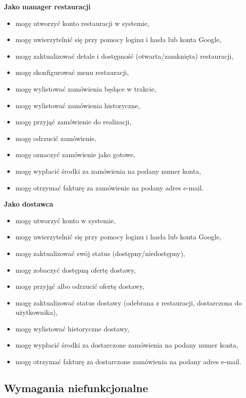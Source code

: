 \medskip

\textbf{Jako manager restauracji}
\begin{itemize}
    \item mogę utworzyć konto restauracji w systemie,
    \item mogę uwierzytelnić się przy pomocy loginu i hasła lub konta Google,
    \item mogę zaktualizować detale i dostępność (otwarta/zamknięta) restauracji,
    \item mogę skonfigurować menu restauracji,
    \item mogę wylistować zamówienia będące w trakcie,
    \item mogę wylistować zamówienia historyczne,
    \item mogę przyjąć zamówienie do realizacji,
    \item mogę odrzucić zamówienie,
    \item mogę oznaczyć zamówienie jako gotowe,
    \item mogę wypłacić środki za zamówienia na podany numer konta,
    \item mogę otrzymać fakturę za zamówienie na podany adres e-mail.
\end{itemize}

\medskip

\textbf{Jako dostawca}
\begin{itemize}
    \item mogę utworzyć konto w systemie,
    \item mogę uwierzytelnić się przy pomocy loginu i hasła lub konta Google,
    \item mogę zaktualizować swój status (dostępny/niedostępny),
    \item mogę zobaczyć dostępną ofertę dostawy,
    \item mogę przyjąć albo odrzucić ofertę dostawy,
    \item mogę zaktualizować status dostawy (odebrana z restauracji, dostarczona do użytkownika),
    \item mogę wylistować historyczne dostawy,
    \item mogę wypłacić środki za dostarczone zamówienia na podany numer konta,
    \item mogę otrzymać fakturę za dostarczone zamówienia na podany adres e-mail.
\end{itemize}

\subsection{Wymagania niefunkcjonalne}

